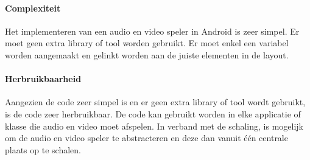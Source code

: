 \paragraph{Complexiteit}
Het implementeren van een audio en video speler in Android is zeer simpel. 
Er moet geen extra library of tool worden gebruikt. Er moet enkel een variabel worden aangemaakt
en gelinkt worden aan de juiste elementen in de layout.

\paragraph{Herbruikbaarheid}
Aangezien de code zeer simpel is en er geen extra library of tool wordt gebruikt,
is de code zeer herbruikbaar. De code kan gebruikt worden in elke applicatie of klasse die audio en video
moet afspelen. In verband met de schaling, is mogelijk om de audio en video speler te abstracteren 
en deze dan vanuit één centrale plaats op te schalen. 
